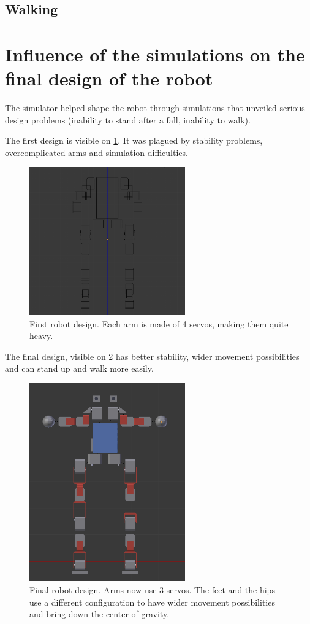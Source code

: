 \subsection{Walking}

\section{Influence of the simulations on the final design of the robot}
The simulator helped shape the robot through simulations that unveiled serious design problems (inability to stand after a fall, inability to walk).

The first design is visible on \cref{fig:first_robot}. It was plagued by stability problems, overcomplicated arms and simulation difficulties. 
\begin{figure}[htp]
\center
\includegraphics[width=0.6\textwidth]{figures/robot1}
\caption[Initial robot design]{First robot design. Each arm is made of 4 servos, making them quite heavy.}
\label{fig:first_robot}
\end{figure}

The final design, visible on \cref{fig:final_robot} has better stability, wider movement possibilities and can stand up and walk more easily. 
\begin{figure}[htp]
\center
\includegraphics[width=0.6\textwidth]{figures/robot2}
\caption[Final robot design]{Final robot design. Arms now use 3 servos. The feet and the hips use a different configuration to have wider movement possibilities and bring down the center of gravity.}
\label{fig:final_robot}
\end{figure}

